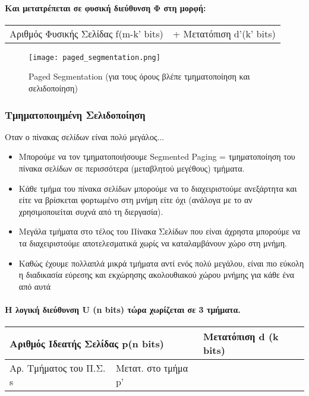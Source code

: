 \paragraph{Και μετατρέπεται σε φυσική διεύθυνση Φ στη μορφή:}
\begin{center}
\begin{tabularx}{0.95\textwidth}{X X}
Αριθμός Φυσικής Σελίδας f(m-k' bits) & + Μετατόπιση d'(k' bits)
\end{tabularx}
\end{center}

\begin{figure}[H]
	\texttt{[image: paged\_segmentation.png]}
	\caption{Paged Segmentation (για τους όρους βλέπε τμηματοποίηση και σελιδοποίηση)}
\end{figure}

\subsubsection{Τμηματοποιημένη Σελιδοποίηση}

Οταν ο πίνακας σελίδων είναι πολύ μεγάλος...
\begin{itemize}
	\item	Μπορούμε να τον τμηματοποιήσουμε Segmented Paging = τμηματοποίηση του πίνακα σελίδων 
		σε περισσότερα (μεταβλητού μεγέθους) τμήματα.
	\item	Κάθε τμήμα του πίνακα σελίδων μπορούμε να το διαχειριστούμε
		ανεξάρτητα και είτε να βρίσκεται φορτωμένο στη μνήμη είτε όχι
		(ανάλογα με το αν χρησιμοποιείται συχνά από τη διεργασία).
	\item	Μεγάλα τμήματα στο τέλος του Πίνακα Σελίδων που είναι
		άχρηστα μπορούμε να τα διαχειριστούμε αποτελεσματικά χωρίς
		να καταλαμβάνουν χώρο στη μνήμη.
	\item	Καθώς έχουμε πολλαπλά μικρά τμήματα αντί ενός πολύ μεγάλου,
		είναι πιο εύκολη η διαδικασία εύρεσης και εκχώρησης
		ακολουθιακού χώρου μνήμης για κάθε ένα από αυτά
\end{itemize}


\paragraph{Η λογική διεύθυνση U (n bits) τώρα χωρίζεται σε 3 τμήματα.}

\begin{center}
\begin{tabularx}{0.95\textwidth}{|X|X|X|}
\hline
\multicolumn{2}{|l|}{Αριθμός Ιδεατής Σελίδας p(n bits)} & {Μετατόπιση d (k bits)} \\
\hline
Αρ. Τμήματος του Π.Σ. s & Μετατ. στο τμήμα p' & {} \\
\hline
\end{tabularx}
\end{center}

